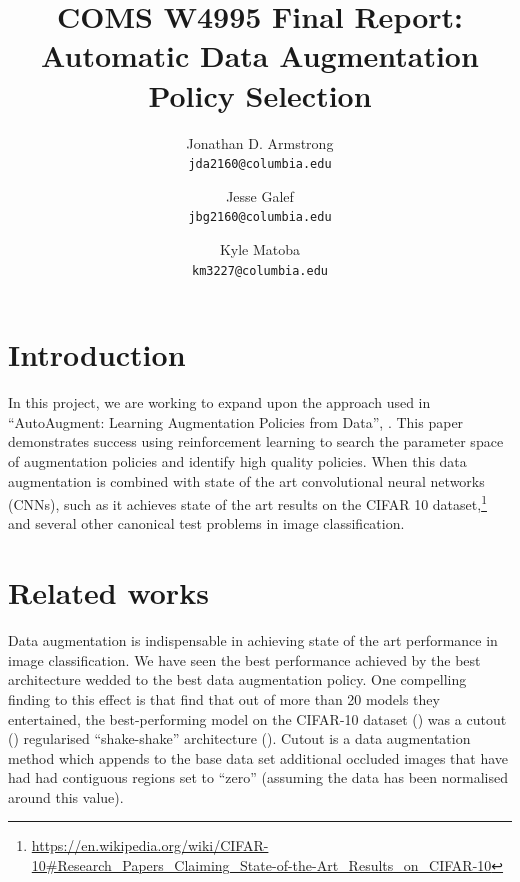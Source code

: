 \documentclass[10pt,twocolumn,letterpaper]{article}
\begin{document}
\title{COMS W4995 Final Report: Automatic Data Augmentation Policy Selection}
\author{Jonathan D. Armstrong\\
{\tt\small jda2160@columbia.edu}
\and
Jesse Galef\\
{\tt\small jbg2160@columbia.edu}
\and
Kyle Matoba\\
{\tt\small km3227@columbia.edu}
}

\maketitle



\section{Introduction}

In this project, we are working to expand upon the approach used in ``AutoAugment: Learning Augmentation Policies from Data'', \cite{Cubuk2018}. This paper demonstrates success using reinforcement learning to search the parameter space of augmentation policies and identify high quality policies. When this data augmentation is combined with state of the art convolutional neural networks (CNNs), such as \cite{Yamada2018} it achieves state of the art results on the CIFAR 10 dataset,\footnote{\url{https://en.wikipedia.org/wiki/CIFAR-10\#Research\_Papers\_Claiming\_State-of-the-Art\_Results\_on\_CIFAR-10}} and several other canonical test problems in image classification.

\section{Related works}

Data augmentation is indispensable in achieving state of the art performance in image classification. We have seen the best performance achieved by the best architecture wedded to the best data augmentation policy.  One compelling finding to this effect is that \cite{Recht2018} find that out of more than 20 models they entertained, the best-performing model on the CIFAR-10 dataset (\cite{Krizhevsky2009}) was a cutout (\cite{Devries2017}) regularised ``shake-shake'' architecture (\cite{Gastaldi2017}). Cutout is a data augmentation method which appends to the base data set additional occluded images that have had had contiguous regions set to ``zero'' (assuming the data has been normalised around this value). 
\end{document}
